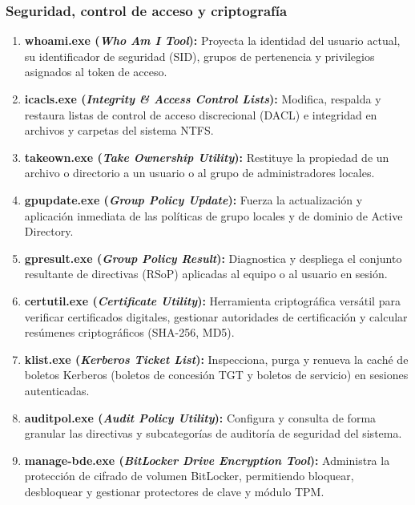 \documentclass[12pt]{article}
\begin{document}
\subsubsection{Seguridad, control de acceso y criptografía}
\begin{enumerate}[leftmargin=*, noitemsep, topsep=1pt]
    \item \textbf{whoami.exe (\textit{Who Am I Tool}):} Proyecta la identidad del usuario actual, su identificador de seguridad (SID), grupos de pertenencia y privilegios asignados al token de acceso.
    \item \textbf{icacls.exe (\textit{Integrity \& Access Control Lists}):} Modifica, respalda y restaura listas de control de acceso discrecional (DACL) e integridad en archivos y carpetas del sistema NTFS.
    \item \textbf{takeown.exe (\textit{Take Ownership Utility}):} Restituye la propiedad de un archivo o directorio a un usuario o al grupo de administradores locales.
    \item \textbf{gpupdate.exe (\textit{Group Policy Update}):} Fuerza la actualización y aplicación inmediata de las políticas de grupo locales y de dominio de Active Directory.
    \item \textbf{gpresult.exe (\textit{Group Policy Result}):} Diagnostica y despliega el conjunto resultante de directivas (RSoP) aplicadas al equipo o al usuario en sesión.
    \item \textbf{certutil.exe (\textit{Certificate Utility}):} Herramienta criptográfica versátil para verificar certificados digitales, gestionar autoridades de certificación y calcular resúmenes criptográficos (SHA-256, MD5).
    \item \textbf{klist.exe (\textit{Kerberos Ticket List}):} Inspecciona, purga y renueva la caché de boletos Kerberos (boletos de concesión TGT y boletos de servicio) en sesiones autenticadas.
    \item \textbf{auditpol.exe (\textit{Audit Policy Utility}):} Configura y consulta de forma granular las directivas y subcategorías de auditoría de seguridad del sistema.
    \item \textbf{manage-bde.exe (\textit{BitLocker Drive Encryption Tool}):} Administra la protección de cifrado de volumen BitLocker, permitiendo bloquear, desbloquear y gestionar protectores de clave y módulo TPM.
\end{enumerate}
\end{document}
